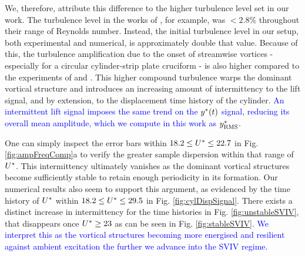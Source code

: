\documentclass[a4paper,fleqn]{cas-sc}
\begin{document}
We, therefore, attribute this difference to the higher turbulence level set in our work. The turbulence level in the works of \citet{Nguyen2012}, for example, was  $<2.8\%$ throughout their range of Reynolds number. Instead, the initial turbulence level in our setup, both experimental and numerical, is approximately double that value. Because of this, the turbulence amplification due to the onset of streamwise vortices  \citep{Zhao2018a} - especially for a circular cylinder-strip plate cruciform \citep{Koide2017} - is also higher compared to the experiments of \citet{Nguyen2012} and \citet{Koide2013}. This higher compound turbulence warps the dominant vortical structure and introduces an increasing amount of intermittency to the lift signal, and by extension, to the displacement time history of the cylinder. \textcolor{blue}{An intermittent lift signal imposes the same trend on the $y^{*}(t)$ signal, reducing its overall mean amplitude, which we compute in this work as $y^{*}_{\text{RMS}}$.}

One can simply inspect the error bars within  $18.2 \leq U^{*} \leq 22.7$ in Fig. \ref{fig:ampFreqComp}a to verify the greater sample dispersion within that range of  $U^{*}$. This intermittency ultimately vanishes as the dominant vortical structures become sufficiently stable to retain enough periodicity in its formation. Our numerical results also seem to support this argument, as evidenced by the time history of  $U^{*}$ within $18.2 \leq U^{*} \leq 29.5$ in Fig. \ref{fig:cylDispSignal}. There exists a distinct increase in intermittency for the time histories in Fig. \ref{fig:unstableSVIV}, that disappears once  $U^{*} \geq 23$ as can be seen in Fig. \ref{fig:stableSVIV}. \textcolor{blue}{We interpret this as the vortical structures becoming more energised and resilient against ambient excitation the further we advance into the SVIV regime.}
\end{document}
